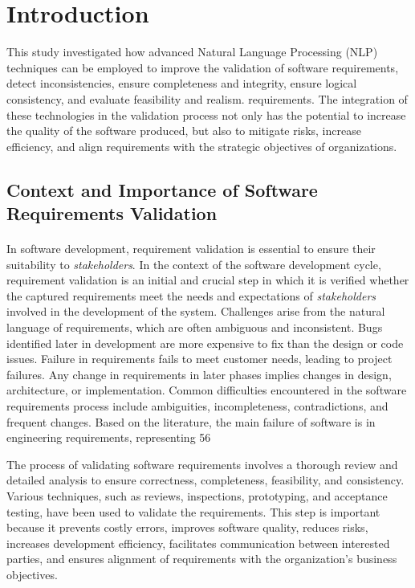 \section{Introduction}
\sloppy 
This study investigated how advanced Natural Language Processing (NLP) techniques can be employed to improve the validation of software requirements, detect inconsistencies, ensure completeness and integrity, ensure logical consistency, and evaluate feasibility and realism. requirements\cite{torfi2020natural}. The integration of these technologies in the validation process not only has the potential to increase the quality of the software produced, but also to mitigate risks, increase efficiency, and align requirements with the strategic objectives of organizations\cite{Wiegers2013,hafiz2016requirements}.

\subsection{Context and Importance of Software Requirements Validation}
\paragraph{}
In software development, requirement validation is essential to ensure their suitability to \textit{stakeholders}\cite{Sommerville2016}. In the context of the software development cycle, requirement validation is an initial and crucial step in which it is verified whether the captured requirements meet the needs and expectations of \textit{stakeholders} involved in the development of the system\cite{Sommerville2016 }. Challenges arise from the natural language of requirements, which are often ambiguous and inconsistent\cite{Pohl2015}. Bugs identified later in development are more expensive to fix than the design or code issues. Failure in requirements fails to meet customer needs, leading to project failures. Any change in requirements in later phases implies changes in design, architecture, or implementation. Common difficulties encountered in the software requirements process include ambiguities, incompleteness, contradictions, and frequent changes\cite{Wiegers2013}. Based on the literature\cite{bilal2016}, the main failure of software is in engineering requirements, representing 56\ %

The process of validating software requirements involves a thorough review and detailed analysis to ensure correctness, completeness, feasibility, and consistency\cite{michael2001}. Various techniques, such as reviews, inspections, prototyping, and acceptance testing, have been used to validate the requirements\cite{mcconnell2004code}. This step is important because it prevents costly errors, improves software quality, reduces risks, increases development efficiency, facilitates communication between interested parties, and ensures alignment of requirements with the organization's business objectives\cite{mcconnell2004code}.

